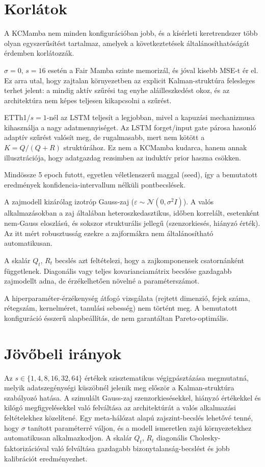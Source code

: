 \section{Korlátok}

A KCMamba nem minden konfigurációban jobb, és a kísérleti keretrendszer
több olyan egyszerűsítést tartalmaz, amelyek a következtetések
általánosíthatóságát érdemben korlátozzák.

$\sigma=0$, $s=16$ esetén a Fair Mamba szinte memorizál, és jóval kisebb
MSE-t ér el. Ez arra utal, hogy zajtalan környezetben az explicit
Kalman-struktúra felesleges terhet jelent: a mindig aktív szűrési tag
enyhe aláilleszkedést okoz, és az architektúra nem képes teljesen
kikapcsolni a szűrést.

ETTh1/$s=1$-nél az LSTM teljesít a legjobban, mivel a kapuzási mechanizmusa
kihasználja a nagy adatmennyiséget. Az LSTM forget/input gate párosa hasonló
adaptív szűrést valósít meg, de rugalmasabb, mert nem kötött a
$K = Q/(Q+R)$ struktúrához. Ez nem a KCMamba kudarca, hanem annak
illusztrációja, hogy adatgazdag rezsimben az induktív prior haszna csökken.

Mindössze 5 epoch futott, egyetlen véletlenszerű maggal (seed), így a
bemutatott eredmények konfidencia-intervallum nélküli pontbecslések.

A zajmodell kizárólag izotróp Gauss-zaj
($\varepsilon \sim \mathcal{N}(0, \sigma^2 I)$). A valós alkalmazásokban
a zaj általában heteroszkedasztikus, időben korrelált, esetenként
nem-Gauss eloszlású, és sokszor strukturális jellegű (szenzorkiesés,
hiányzó érték). Az itt mért robusztusság ezekre a zajformákra nem
általánosítható automatikusan.

A skalár $Q_t$, $R_t$ becslés azt feltételezi, hogy a zajkomponensek
csatornánként függetlenek. Diagonális vagy teljes kovarianciamátrix
becslése gazdagabb zajmodellt adna, de érzékelhetően növelné a
paraméterszámot.

A hiperparaméter-érzékenység átfogó vizsgálata (rejtett dimenzió,
fejek száma, rétegszám, kernelméret, tanulási sebesség) nem történt meg.
A bemutatott konfiguráció ésszerű alapbeállítás, de nem garantáltan
Pareto-optimális.

\section{Jövőbeli irányok}

Az $s \in \{1, 4, 8, 16, 32, 64\}$ értékek szisztematikus végigpásztázása
megmutatná, melyik adatszegénységi küszöbnél jelenik meg először a
Kalman-struktúra szabályozó hatása. A szimulált Gauss-zaj szenzorkiesésekkel,
hiányzó értékekkel és kilógó megfigyelésekkel való felváltása az architektúrát
a valós alkalmazási feltételekhez közelítené. Egy meta-hálózat alapú
zajszint-becslés lehetővé tenné, hogy $\sigma$ tanított paraméterré váljon,
és a modell ismeretlen zajú környezetekhez automatikusan alkalmazkodjon.
A skalár $Q_t$, $R_t$ diagonális Cholesky-faktorizációval való felváltása
gazdagabb bizonytalanság-becslést és jobb kalibrációt eredményezhet.
